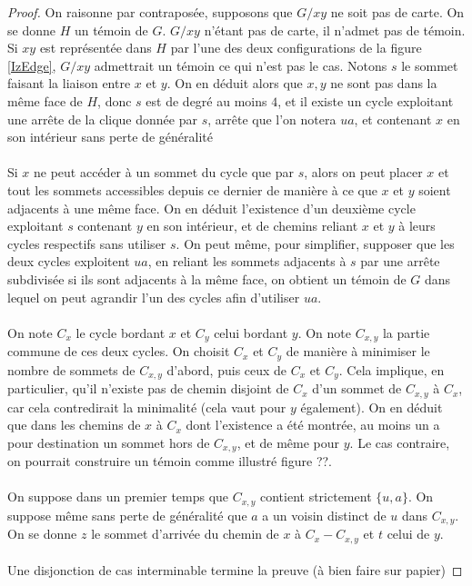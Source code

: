 \documentclass{scrartcl}
\begin{document}
\begin{flushleft}
\begin{proof}
    On raisonne par contraposée, supposons que $G / xy$ ne soit pas de carte. On se donne $H$ un témoin de $G$.
    $G / xy$ n'étant pas de carte, il n'admet pas de témoin. Si $xy$ est représentée dans $H$ par l'une des deux configurations
    de la figure \ref{IzEdge}, $G / xy$ admettrait un témoin ce qui n'est pas le cas. Notons $s$ le sommet faisant la liaison
    entre $x$ et $y$. On en déduit alors que $x, y$ ne sont pas dans la même face de $H$, donc $s$ est de degré au moins $4$,
    et il existe un cycle exploitant une arrête de la clique donnée par $s$, arrête que l'on notera $ua$, et contenant $x$
    en son intérieur sans perte de généralité
    \\~\\
    Si $x$ ne peut accéder à un sommet du cycle que par $s$, alors on peut placer $x$ et tout les sommets accessibles
    depuis ce dernier de manière à ce que $x$ et $y$ soient adjacents à une même face. On en déduit l'existence d'un deuxième
    cycle exploitant $s$ contenant $y$ en son intérieur, et de chemins reliant $x$ et $y$ à leurs cycles respectifs sans utiliser
    $s$. On peut même, pour simplifier, supposer que les deux cycles exploitent $ua$, en reliant les sommets adjacents à $s$ par
    une arrête subdivisée si ils sont adjacents à la même face, on obtient un témoin de $G$ dans lequel on peut agrandir
    l'un des cycles afin d'utiliser $ua$.
    \\~\\
    On note $C_x$ le cycle bordant $x$ et $C_y$ celui bordant $y$. On note $C_{x, y}$ la partie commune de ces deux cycles.
    On choisit $C_x$ et $C_y$ de manière à minimiser le nombre de sommets de $C_{x,y}$ d'abord, puis ceux de $C_x$ et $C_y$.
    Cela implique, en particulier, qu'il n'existe pas de chemin disjoint de $C_x$ d'un sommet de $C_{x,y}$ à $C_x$, car
    cela contredirait la minimalité (cela vaut pour $y$ également). On en déduit que dans les chemins de $x$ à $C_x$ dont
    l'existence a été montrée, au moins un a pour destination un sommet hors de $C_{x,y}$, et de même pour $y$.
    Le cas contraire, on pourrait construire un témoin comme illustré figure ??.
    \\~\\
    On suppose dans un premier temps que $C_{x,y}$ contient strictement $\{u, a\}$. On suppose même sans perte de généralité
    que $a$ a un voisin distinct de $u$ dans $C_{x, y}$. On se donne $z$ le sommet d'arrivée du chemin de $x$ à
    $C_x - C_{x,y}$ et $t$ celui de $y$.
    \\~\\
    Une disjonction de cas interminable termine la preuve (à bien faire sur papier)
\end{proof}


\end{flushleft}
\end{document}
